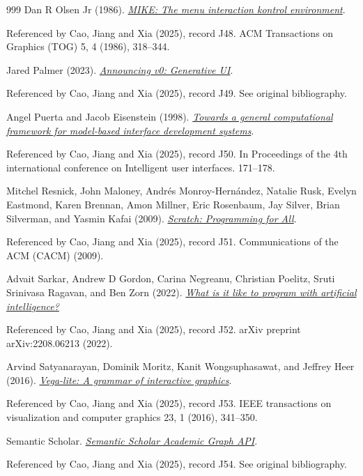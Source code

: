 \documentclass[11pt,letterpaper]{article}
\begin{document}
\begin{thebibliography}{999}
Dan R Olsen Jr (1986).
\href{https://arxiv.org/html/2503.04084v1\#bib.bib49}{\emph{MIKE: The menu interaction kontrol environment}}.
\par {\small Referenced by Cao, Jiang and Xia (2025), record J48. ACM Transactions on Graphics (TOG) 5, 4 (1986), 318–344.}

Jared Palmer (2023).
\href{https://vercel.com/blog/announcing-v0-generative-ui}{\emph{Announcing v0: Generative UI}}.
\par {\small Referenced by Cao, Jiang and Xia (2025), record J49. See original bibliography.}

Angel Puerta and Jacob Eisenstein (1998).
\href{https://www.arpuerta.com/pdf/iui99.pdf}{\emph{Towards a general computational framework for model-based interface development systems}}.
\par {\small Referenced by Cao, Jiang and Xia (2025), record J50. In Proceedings of the 4th international conference on Intelligent user interfaces. 171–178.}

Mitchel Resnick, John Maloney, Andrés Monroy-Hernández, Natalie Rusk, Evelyn Eastmond, Karen Brennan, Amon Millner, Eric Rosenbaum, Jay Silver, Brian Silverman, and Yasmin Kafai (2009).
\href{https://doi.org/10.1145/1592761.1592779}{\emph{Scratch: Programming for All}}.
\par {\small Referenced by Cao, Jiang and Xia (2025), record J51. Communications of the ACM (CACM) (2009).}

Advait Sarkar, Andrew D Gordon, Carina Negreanu, Christian Poelitz, Sruti Srinivasa Ragavan, and Ben Zorn (2022).
\href{https://arxiv.org/abs/2208.06213}{\emph{What is it like to program with artificial intelligence?}}
\par {\small Referenced by Cao, Jiang and Xia (2025), record J52. arXiv preprint arXiv:2208.06213 (2022).}

Arvind Satyanarayan, Dominik Moritz, Kanit Wongsuphasawat, and Jeffrey Heer (2016).
\href{https://vis.csail.mit.edu/pubs/vega-lite/}{\emph{Vega-lite: A grammar of interactive graphics}}.
\par {\small Referenced by Cao, Jiang and Xia (2025), record J53. IEEE transactions on visualization and computer graphics 23, 1 (2016), 341–350.}

Semantic Scholar.
\href{https://www.semanticscholar.org/product/api}{\emph{Semantic Scholar Academic Graph API}}.
\par {\small Referenced by Cao, Jiang and Xia (2025), record J54. See original bibliography.}


\end{thebibliography}
\end{document}
